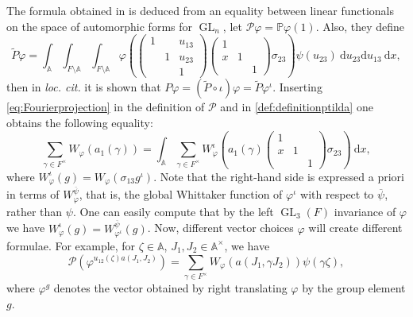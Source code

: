 \documentclass[a4paper,11pt]{amsart}
\theoremstyle{definition}
\newcommand{\A}{\mathbb{A}}
\newcommand{\gelle}{\operatorname{GL}}
\begin{document}
The formula obtained in \cite{IchinoTemplier} is deduced from an equality between linear functionals on the space of automorphic forms for $\gelle_n$, let $\mathcal{P}\varphi = \mathbb{P}\varphi(1)$. Also, they define 
\begin{equation}\label{def:definitionptilda}\tilde{P}\varphi = \int_{\A}\int_{F\setminus \A}\int_{F\setminus\A}\varphi\left(\begin{pmatrix}
    1&&u_{13}\\&1&u_{23}\\&&1
\end{pmatrix}\begin{pmatrix}
    1&\\x&1\\&&1
\end{pmatrix}\sigma_{23}\right)\psi(u_{23})\ \mathrm{d}u_{23}\mathrm{d}u_{13}\ \mathrm{d}x,\end{equation}
then in \emph{loc. cit.} it is shown that $P\varphi =(\tilde{P}\circ \iota) \varphi= \tilde{P}\varphi^{\iota}$. Inserting \eqref{eq:Fourierprojection} in the definition of $\mathcal{P}$ and in \eqref{def:definitionptilda} one obtains the following equality:
\begin{equation}\label{eq:lefthandsidevoronoi}
    \sum_{\gamma \in F^{\times}}W_{\varphi}(a_1(\gamma)) = \int_{\A}\sum_{\gamma \in F^{\times}}W_{\varphi}^{\iota}\left(a_1(\gamma)\begin{pmatrix}
        1&&\\x&1\\&&1
    \end{pmatrix}\sigma_{23}\right) \ \mathrm{d}x,
\end{equation}
where $W_{\varphi}^{\iota}(g) = W_{\varphi}(\sigma_{13}g^\iota)$. Note that the right-hand side is expressed a priori in terms of $W_{\varphi}^{\overline{\psi}}$, that is, the global Whittaker function of $\varphi^{\iota}$ with respect to $\overline{\psi}$, rather than $\psi$. One can easily compute that by the left $\gelle_3(F)$ invariance of $\varphi$ we have $W_{\varphi}^{\iota}(g) = W_{\varphi^{\iota}}^{\overline{\psi}}(g)$.
Now, different vector choices $\varphi$ will create different formulae. For example, for $\zeta \in \A$, $J_1,J_2\in \A^{\times}$, we have 
\begin{equation*}\mathcal{P}(\varphi^{u_{12}(\zeta)a(J_1,J_2)}) = \sum_{\gamma \in F^{\times}}W_{\varphi}(a(J_1,\gamma J_2))\psi(\gamma\zeta), \end{equation*}
where $\varphi^{g}$ denotes the vector obtained by right translating $\varphi$ by the group element $g$. 
\end{document}

